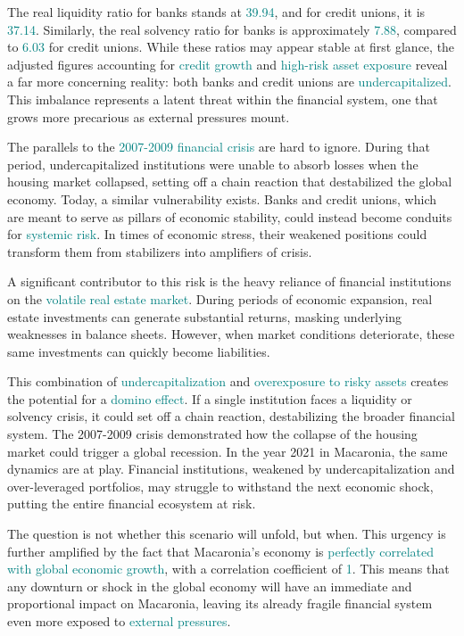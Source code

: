 The real liquidity ratio for banks stands at \textcolor{teal}{39.94}, and for credit unions, it is \textcolor{teal}{37.14}. Similarly, the real solvency ratio for banks is approximately \textcolor{teal}{7.88}, compared to \textcolor{teal}{6.03} for credit unions. While these ratios may appear stable at first glance, the adjusted figures accounting for \textcolor{teal}{credit growth} and \textcolor{teal}{high-risk asset exposure} reveal a far more concerning reality: both banks and credit unions are \textcolor{teal}{undercapitalized}. This imbalance represents a latent threat within the financial system, one that grows more precarious as external pressures mount.

The parallels to the \textcolor{teal}{2007-2009 financial crisis} are hard to ignore. During that period, undercapitalized institutions were unable to absorb losses when the housing market collapsed, setting off a chain reaction that destabilized the global economy. Today, a similar vulnerability exists. Banks and credit unions, which are meant to serve as pillars of economic stability, could instead become conduits for \textcolor{teal}{systemic risk}. In times of economic stress, their weakened positions could transform them from stabilizers into amplifiers of crisis.

A significant contributor to this risk is the heavy reliance of financial institutions on the \textcolor{teal}{volatile real estate market}. During periods of economic expansion, real estate investments can generate substantial returns, masking underlying weaknesses in balance sheets. However, when market conditions deteriorate, these same investments can quickly become liabilities.

This combination of \textcolor{teal}{undercapitalization} and \textcolor{teal}{overexposure to risky assets} creates the potential for a \textcolor{teal}{domino effect}. If a single institution faces a liquidity or solvency crisis, it could set off a chain reaction, destabilizing the broader financial system. The 2007-2009 crisis demonstrated how the collapse of the housing market could trigger a global recession. In the year 2021 in Macaronia, the same dynamics are at play. Financial institutions, weakened by undercapitalization and over-leveraged portfolios, may struggle to withstand the next economic shock, putting the entire financial ecosystem at risk.

The question is not whether this scenario will unfold, but when. This urgency is further amplified by the fact that Macaronia's economy is \textcolor{teal}{perfectly correlated with global economic growth}, with a correlation coefficient of \textcolor{teal}{1}. This means that any downturn or shock in the global economy will have an immediate and proportional impact on Macaronia, leaving its already fragile financial system even more exposed to \textcolor{teal}{external pressures}.
\textcolor{orange}{\cite{UNCTAD2023FDI}}

